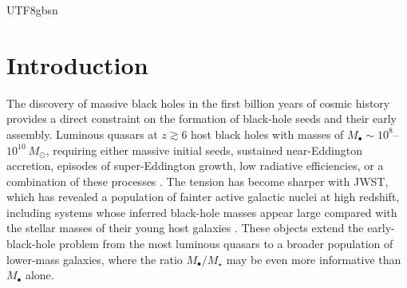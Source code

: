 \documentclass[trackchanges, twocolappendix, twocolumn]{aastex701}
\begin{document}
\begin{CJK*}{UTF8}{gbsn}

\section{Introduction} \label{sect:intro}

The discovery of massive black holes in the first billion years of cosmic history provides a direct constraint on the formation of black-hole seeds and their early assembly. Luminous quasars at $z \gtrsim 6$ host black holes with masses of $M_{\bullet} \sim 10^8$--$10^{10}~M_\odot$, requiring either massive initial seeds, sustained near-Eddington accretion, episodes of super-Eddington growth, low radiative efficiencies, or a combination of these processes \citep[e.g.,][]{Banados+2018SMBH, Matsuoka+2023SMBH, Larson+2023SMBH, Kocevski+2023SMBH, Harikane+2023SMBH, Bogdan+2024SMBH, Furtak+2024SMBH}. The tension has become sharper with JWST, which has revealed a population of fainter active galactic nuclei at high redshift, including systems whose inferred black-hole masses appear large compared with the stellar masses of their young host galaxies \citep[e.g.,][]{Maiolino+2024GNz11, Natarajan+2024UHZ1, Furtak+2024A2744QSO1}. These objects extend the early-black-hole problem from the most luminous quasars to a broader population of lower-mass galaxies, where the ratio $M_{\bullet}/M_\star$ may be even more informative than $M_{\bullet}$ alone.


\end{CJK*}
\end{document}
